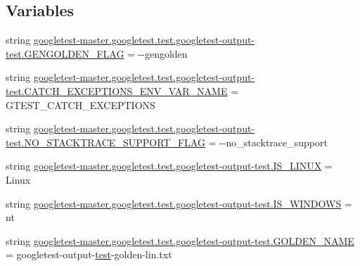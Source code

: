 \subsection*{Variables}
\begin{DoxyCompactItemize}
\item 
string \mbox{\hyperlink{namespacegoogletest-master_1_1googletest_1_1test_1_1googletest-output-test_ad135fab7145859a10cfb4396102e0aec}{googletest-\/master.\+googletest.\+test.\+googletest-\/output-\/test.\+G\+E\+N\+G\+O\+L\+D\+E\+N\+\_\+\+F\+L\+AG}} = \textquotesingle{}-\/-\/gengolden\textquotesingle{}
\item 
string \mbox{\hyperlink{namespacegoogletest-master_1_1googletest_1_1test_1_1googletest-output-test_a4f9e8f9373b6d46ddc079fc375a1f53d}{googletest-\/master.\+googletest.\+test.\+googletest-\/output-\/test.\+C\+A\+T\+C\+H\+\_\+\+E\+X\+C\+E\+P\+T\+I\+O\+N\+S\+\_\+\+E\+N\+V\+\_\+\+V\+A\+R\+\_\+\+N\+A\+ME}} = \textquotesingle{}G\+T\+E\+S\+T\+\_\+\+C\+A\+T\+C\+H\+\_\+\+E\+X\+C\+E\+P\+T\+I\+O\+NS\textquotesingle{}
\item 
string \mbox{\hyperlink{namespacegoogletest-master_1_1googletest_1_1test_1_1googletest-output-test_a358993e918d2256d325466f48896348f}{googletest-\/master.\+googletest.\+test.\+googletest-\/output-\/test.\+N\+O\+\_\+\+S\+T\+A\+C\+K\+T\+R\+A\+C\+E\+\_\+\+S\+U\+P\+P\+O\+R\+T\+\_\+\+F\+L\+AG}} = \textquotesingle{}-\/-\/no\+\_\+stacktrace\+\_\+support\textquotesingle{}
\item 
string \mbox{\hyperlink{namespacegoogletest-master_1_1googletest_1_1test_1_1googletest-output-test_a3de5adb5b70e7087ad52c14cf12fe073}{googletest-\/master.\+googletest.\+test.\+googletest-\/output-\/test.\+I\+S\+\_\+\+L\+I\+N\+UX}} = \textquotesingle{}Linux\textquotesingle{}
\item 
string \mbox{\hyperlink{namespacegoogletest-master_1_1googletest_1_1test_1_1googletest-output-test_ad9e2db1e3e3cfd312dc333e8bdce1b7d}{googletest-\/master.\+googletest.\+test.\+googletest-\/output-\/test.\+I\+S\+\_\+\+W\+I\+N\+D\+O\+WS}} = \textquotesingle{}nt\textquotesingle{}
\item 
string \mbox{\hyperlink{namespacegoogletest-master_1_1googletest_1_1test_1_1googletest-output-test_a54841f0cc54659ea2d823867932dd1f6}{googletest-\/master.\+googletest.\+test.\+googletest-\/output-\/test.\+G\+O\+L\+D\+E\+N\+\_\+\+N\+A\+ME}} = \textquotesingle{}googletest-\/output-\/\mbox{\hyperlink{_mutual_8h_a707ee03719e99670bf6cfdfd897b8456}{test}}-\/golden-\/lin.\+txt\textquotesingle{}
\item 

\end{DoxyCompactItemize}
